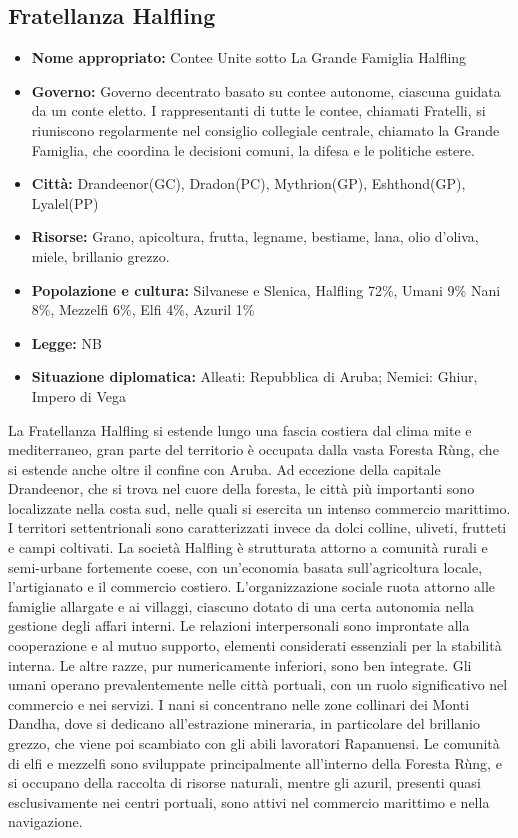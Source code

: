 \documentclass[10pt, a4paper]{report}
\begin{document}
\begin{multicols}{2}
\subsection*{Fratellanza Halfling}
\begin{itemize}
	\item \textbf{Nome appropriato:} Contee Unite sotto La Grande Famiglia Halfling
	\item \textbf{Governo:} Governo decentrato basato su contee autonome, ciascuna guidata da un conte eletto. I rappresentanti di tutte le contee, chiamati Fratelli, si riuniscono regolarmente nel consiglio collegiale centrale, chiamato la Grande Famiglia, che coordina le decisioni comuni, la difesa e le politiche estere.
	\item \textbf{Città:} Drandeenor(GC), Dradon(PC), Mythrion(GP), Eshthond(GP), Lyalel(PP)
	\item \textbf{Risorse:} Grano, apicoltura, frutta, legname, bestiame, lana, olio d'oliva, miele, brillanio grezzo.
	\item \textbf{Popolazione e cultura:} Silvanese e Slenica, Halfling 72\%, Umani 9\% Nani 8\%, Mezzelfi 6\%, Elfi 4\%, Azuril 1\%
	\item \textbf{Legge:} NB
	\item \textbf{Situazione diplomatica:} Alleati: Repubblica di Aruba; Nemici: Ghiur, Impero di Vega
\end{itemize}
La Fratellanza Halfling si estende lungo una fascia costiera dal clima mite e mediterraneo, gran parte del territorio è occupata dalla vasta Foresta Rùng, che si estende anche oltre il confine con Aruba. Ad eccezione della capitale Drandeenor, che si trova nel cuore della foresta, le città più importanti sono localizzate nella costa sud, nelle quali si esercita un intenso commercio marittimo. I territori settentrionali sono caratterizzati invece da dolci colline, uliveti, frutteti e campi coltivati.
La società Halfling è strutturata attorno a comunità rurali e semi-urbane fortemente coese, con un’economia basata sull’agricoltura locale, l’artigianato e il commercio costiero. L’organizzazione sociale ruota attorno alle famiglie allargate e ai villaggi, ciascuno dotato di una certa autonomia nella gestione degli affari interni. Le relazioni interpersonali sono improntate alla cooperazione e al mutuo supporto, elementi considerati essenziali per la stabilità interna.
Le altre razze, pur numericamente inferiori, sono ben integrate. Gli umani operano prevalentemente nelle città portuali, con un ruolo significativo nel commercio e nei servizi. I nani si concentrano nelle zone collinari dei Monti Dandha, dove si dedicano all’estrazione mineraria, in particolare del brillanio grezzo, che viene poi scambiato con gli abili lavoratori Rapanuensi. Le comunità di elfi e mezzelfi sono sviluppate principalmente all'interno della Foresta Rùng, e si occupano della raccolta di risorse naturali, mentre gli azuril, presenti quasi esclusivamente nei centri portuali, sono attivi nel commercio marittimo e nella navigazione.

\end{multicols}
\end{document}
